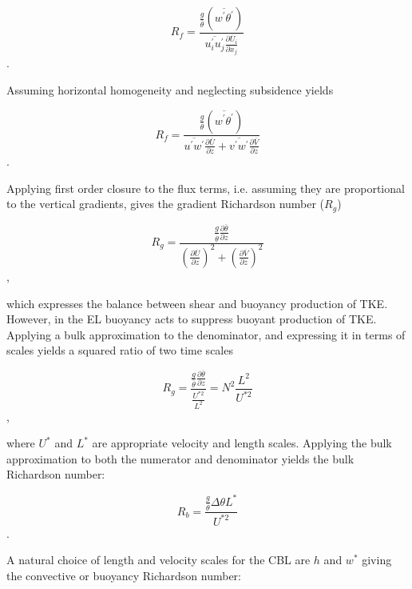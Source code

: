 \begin{equation}
R_{f} = \frac{\frac{g}{\overline{\theta}} \left( \overline{w^{'}\theta^{'}} \right)}{\overline{u_{i}^{'}u_{j}^{'}}\frac{\partial \overline{U}_{i}}{\partial x_{j}}}
\end{equation}.
 
Assuming horizontal homogeneity and neglecting subsidence yields
  
\begin{equation}
R_{f} = \frac{\frac{g}{\overline{\theta}} \left( \overline{w^{'}\theta^{'}} \right)}{\overline{u^{'}w^{'}}\frac{\partial \overline{U}}{\partial z} + \overline{v^{'}w^{'}}\frac{\partial \overline{V}}{\partial z}}
\end{equation}.

Applying first order closure to the flux terms, i.e. assuming they are proportional to the vertical gradients, gives the gradient Richardson number ($R_{g}$)

\begin{equation}
R_{g} = \frac{ \frac{g}{\overline{\theta}} \frac{\partial \overline{\theta}}{\partial z}}{\left( \frac{ \partial \overline{U}}{\partial z} \right)^{2} + \left( \frac{\partial \overline{V}}{\partial z} \right)^{2}} 
\end{equation},

which expresses the balance between shear and buoyancy production of \acs{TKE}.  However, in the \acs{EL} buoyancy acts to suppress buoyant production of \acs{TKE}.  Applying a bulk approximation to the denominator, and expressing it in terms of scales yields a squared ratio of two time scales

\begin{equation}
R_{g} = \frac{\frac{g}{\overline{\theta}} \frac{\partial \overline{\theta}}{\partial z}}{\frac{U^{*2}}{L^{2}}} = N^{2}\frac{L^{2}}{U^{*2}}
\end{equation},


where $U^{*}$ and $L^{*}$ are appropriate velocity and length scales.  Applying the bulk approximation to both the numerator and denominator yields
the bulk Richardson number:

\begin{equation}
R_{b} = \frac{\frac{g}{\overline{\theta}} \Delta \theta L^{*}}{U^{*2}}
\end{equation}.

A natural choice of length and velocity scales for the \acs{CBL} are $h$ and $w^{*}$ giving the convective or buoyancy Richardson number:

